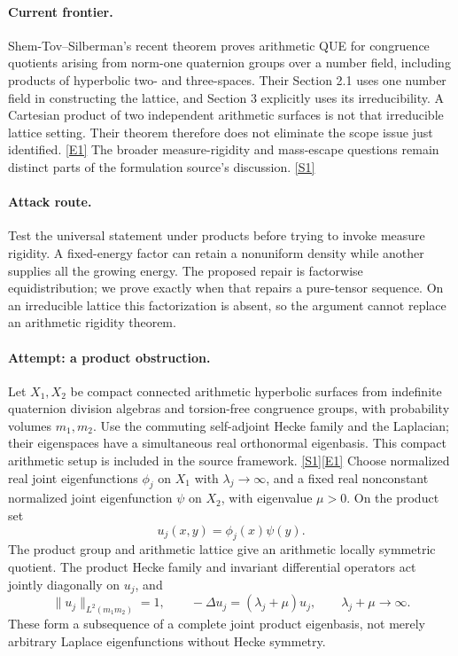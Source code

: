 \documentclass[11pt,a4paper]{article}
\newcommand{\sref}[2]{\hyperlink{source:#1:#2}{[S#2]}}
\newcommand{\eref}[2]{\hyperlink{extra:#1:#2}{[E#2]}}
\numberwithin{equation}{section}
\begin{document}
\paragraph{Current frontier.}
Shem-Tov--Silberman's recent theorem proves arithmetic QUE for congruence
quotients arising from norm-one quaternion groups over a number field,
including products of hyperbolic two- and three-spaces. Their Section 2.1
uses one number field in constructing the lattice, and Section 3 explicitly
uses its irreducibility. A Cartesian product of two independent arithmetic
surfaces is not that irreducible lattice setting. Their theorem therefore
does not eliminate the scope issue just identified. \eref{statement}{1}
The broader measure-rigidity and mass-escape questions remain distinct
parts of the formulation source's discussion. \sref{statement}{1}

\paragraph{Attack route.}
Test the universal statement under products before trying to invoke measure
rigidity. A fixed-energy factor can retain a nonuniform density while
another supplies all the growing energy. The proposed repair is factorwise
equidistribution; we prove exactly when that repairs a pure-tensor sequence.
On an irreducible lattice this factorization is absent, so the argument
cannot replace an arithmetic rigidity theorem.

\paragraph{Attempt: a product obstruction.}
Let $X_1,X_2$ be compact connected arithmetic hyperbolic surfaces from
indefinite quaternion division algebras and torsion-free congruence groups,
with probability volumes $m_1,m_2$. Use the commuting self-adjoint Hecke
family and the Laplacian; their eigenspaces have a simultaneous real
orthonormal eigenbasis. This compact arithmetic setup is included in the
source framework. \sref{statement}{1}\eref{statement}{1}
Choose normalized real joint eigenfunctions $\phi_j$ on $X_1$ with
$\lambda_j\to\infty$, and a fixed real nonconstant normalized joint
eigenfunction $\psi$ on $X_2$, with eigenvalue $\mu>0$. On the product set
\[
 u_j(x,y)=\phi_j(x)\psi(y).
\]
The product group and arithmetic lattice give an arithmetic locally
symmetric quotient. The product Hecke family and invariant differential
operators act jointly diagonally on $u_j$, and
\[
 \|u_j\|_{L^2(m_1m_2)}=1,
 \qquad -\Delta u_j=(\lambda_j+\mu)u_j,
 \qquad \lambda_j+\mu\longrightarrow\infty.
\]
These form a subsequence of a complete joint product eigenbasis, not merely
arbitrary Laplace eigenfunctions without Hecke symmetry.
\end{document}
